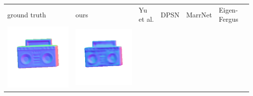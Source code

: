 \begin{center}
\begin{tabularx}{\linewidth}{@{}Y@{}Y@{}Y@{}Y@{}Y@{}Y@{}}
ground truth & ours & Yu et al. & DPSN & MarrNet & Eigen-Fergus \\
\includegraphics[width=\linewidth]{semisynthetic/20160617_19_gt.png} &
\includegraphics[width=\linewidth]{semisynthetic/20160617_19_ours_out.png} &

\end{tabularx}
\end{center}
